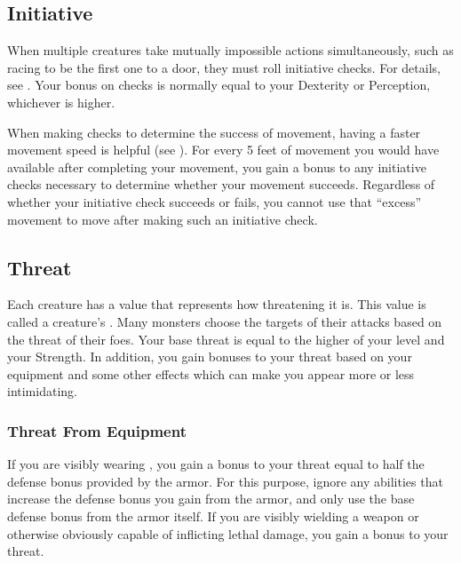     \subsection{Initiative}\label{Initiative}
        When multiple creatures take mutually impossible actions simultaneously, such as racing to be the first one to a door, they must roll initiative checks.
        For details, see .
        Your bonus on  checks is normally equal to your Dexterity or Perception, whichever is higher.

        \label{Movement-Based Initiative}
        When making  checks to determine the success of movement, having a faster movement speed is helpful (see ).
        For every 5 feet of movement you would have available after completing your movement, you gain a  bonus to any initiative checks necessary to determine whether your movement succeeds.
        Regardless of whether your initiative check succeeds or fails, you cannot use that ``excess'' movement to move after making such an initiative check.

    \subsection{Threat}\label{Threat}
        Each creature has a value that represents how threatening it is.
        This value is called a creature's .
        Many monsters choose the targets of their attacks based on the threat of their foes.
        Your base threat is equal to the higher of your level and your Strength.
        In addition, you gain bonuses to your threat based on your equipment and some other effects which can make you appear more or less intimidating.

        \subsubsection{Threat From Equipment}
            If you are visibly wearing , you gain a bonus to your threat equal to half the defense bonus provided by the armor.
            For this purpose, ignore any abilities that increase the defense bonus you gain from the armor, and only use the base defense bonus from the armor itself.
            If you are visibly wielding a weapon or otherwise obviously capable of inflicting lethal damage, you gain a  bonus to your threat.

